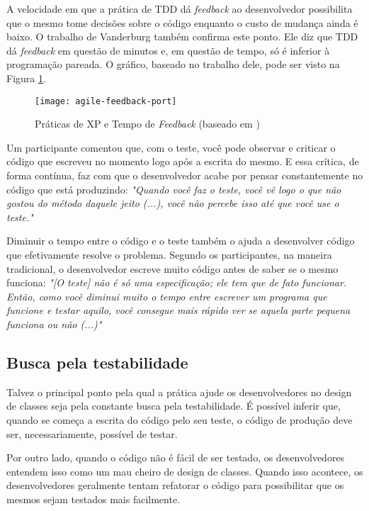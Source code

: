 A velocidade em que a prática de TDD dá \textit{feedback} ao desenvolvedor possibilita que o mesmo
tome decisões sobre o código enquanto o custo de mudança ainda é
baixo. O trabalho de Vanderburg \cite{vanderburg} também confirma este ponto.
Ele diz que TDD dá \textit{feedback} em questão de
minutos e, em questão de tempo, só é inferior à programação pareada. O gráfico,
baseado no trabalho dele, pode ser visto na Figura
\ref{fig:agile-feedback}.

\begin{figure}
  \centering
  \texttt{[image: agile-feedback-port]}
  \caption{Práticas de XP e Tempo de \textit{Feedback} (baseado em \cite{vanderburg})}
  \label{fig:agile-feedback}
\end{figure}

Um participante comentou que, com o teste, você pode observar
e criticar o código que escreveu no momento logo após a escrita do mesmo.
E essa crítica, de forma contínua, faz com que o desenvolvedor acabe
por pensar constantemente no código que está produzindo:
\textit{"Quando você faz o teste, você vê logo o que não gostou do método daquele jeito (...), você
não percebe isso até que você use o teste."}

Diminuir o tempo entre o código e o teste também o ajuda a desenvolver código
que efetivamente resolve o problema. Segundo os participantes, na maneira tradicional, 
o desenvolvedor escreve muito código antes de saber se o mesmo funciona:
\textit{"[O teste] não é só uma especificação; ele tem que de fato funcionar. Então,
como você diminui muito o tempo entre escrever um programa que funcione e testar aquilo,
você consegue mais rápido ver se aquela parte pequena funciona ou não (...)"}


\subsection{Busca pela testabilidade}

Talvez o principal ponto pela qual a prática ajude os desenvolvedores no design de classes 
seja pela constante busca pela testabilidade. É possível inferir que, quando se 
começa a escrita do código pelo seu teste, o código de produção deve ser, necessariamente,
possível de testar.

Por outro lado, quando o código não é fácil de ser testado, os desenvolvedores
entendem isso como um mau cheiro de design de classes. Quando isso acontece,
os desenvolvedores geralmente tentam refatorar o código para possibilitar que
os mesmos sejam testados mais facilmente.

